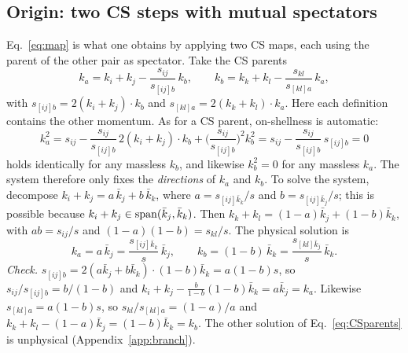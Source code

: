 \documentclass[11pt,a4paper]{article}
\newcommand{\jb}{\bar k_{j}}
\newcommand{\kb}{\bar k_{k}}
\begin{document}
\subsection{Origin: two CS steps with mutual spectators}
\label{sec:CSform}
Eq.~\eqref{eq:map} is what one obtains by applying two CS maps, each using the parent of the other
pair as spectator. Take the CS parents
\begin{equation}
k_a=k_i+k_j-\frac{s_{ij}}{s_{[ij]b}}\,k_b,\qquad
k_b=k_k+k_l-\frac{s_{kl}}{s_{[kl]a}}\,k_a,
\label{eq:CSparents}
\end{equation}
with $s_{[ij]b}=2(k_i+k_j)\cdot k_b$ and $s_{[kl]a}=2(k_k+k_l)\cdot k_a$. Here each definition contains the other momentum.
As for a CS parent, on-shellness is automatic:
\begin{equation}
k_a^2=s_{ij}-\frac{s_{ij}}{s_{[ij]b}}\,2(k_i+k_j)\cdot k_b+\Big(\frac{s_{ij}}{s_{[ij]b}}\Big)^2k_b^2
=s_{ij}-\frac{s_{ij}}{s_{[ij]b}}\,s_{[ij]b}=0
\end{equation}
holds identically for any massless $k_b$, and likewise $k_b^2=0$ for any massless $k_a$.
The system therefore only fixes the \emph{directions} of $k_a$ and $k_b$.
To solve the system, decompose $k_i+k_j=a\,\jb+b\,\kb$, where $a=s_{[ij]\kb}/s$ and $b=s_{[ij]\jb}/s$; this is possible
because $k_i+k_j\in{\rm span}(\jb,\kb)$. Then $k_k+k_l=(1-a)\jb+(1-b)\kb$, with $ab=s_{ij}/s$ and $(1-a)(1-b)=s_{kl}/s$.
The physical solution is
\begin{equation}
k_a=a\,\jb=\frac{s_{[ij]\kb}}{s}\,\jb,\qquad
k_b=(1-b)\,\kb=\frac{s_{[kl]\jb}}{s}\,\kb .
\label{eq:CSsol}
\end{equation}
\textit{Check.} $s_{[ij]b}=2(a\jb+b\kb)\cdot(1-b)\kb=a(1-b)s$, so $s_{ij}/s_{[ij]b}=b/(1-b)$ and
$k_i+k_j-\frac{b}{1-b}(1-b)\kb=a\jb=k_a$. Likewise $s_{[kl]a}=a(1-b)s$, so $s_{kl}/s_{[kl]a}=(1-a)/a$ and $k_k+k_l-(1-a)\jb=(1-b)\kb=k_b$.
The other solution of Eq.~\eqref{eq:CSparents} is unphysical (Appendix~\ref{app:branch}).
\end{document}
